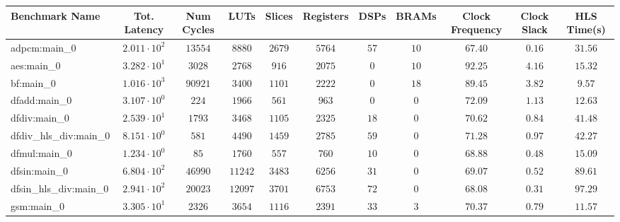 \begin{tabular}{|l|c|c|c|c|c|c|c|c|c|c|}
\hline
Benchmark Name          & Tot. Latency           & Num Cycles & LUTs      & Slices    & Registers & DSPs    & BRAMs   & Clock Frequency & Clock Slack & HLS Time(s) \\
\hline
adpcm:main\_0           & $ 2.011 \cdot 10^{2} $ & $ 13554  $ & $ 8880  $ & $ 2679  $ & $ 5764  $ & $ 57  $ & $ 10  $ & $ 67.40       $ & $ 0.16    $ & $ 31.56   $ \\
aes:main\_0             & $ 3.282 \cdot 10^{1} $ & $ 3028   $ & $ 2768  $ & $ 916   $ & $ 2075  $ & $ 0   $ & $ 10  $ & $ 92.25       $ & $ 4.16    $ & $ 15.32   $ \\
bf:main\_0              & $ 1.016 \cdot 10^{3} $ & $ 90921  $ & $ 3400  $ & $ 1101  $ & $ 2222  $ & $ 0   $ & $ 18  $ & $ 89.45       $ & $ 3.82    $ & $ 9.57    $ \\
dfadd:main\_0           & $ 3.107 \cdot 10^{0} $ & $ 224    $ & $ 1966  $ & $ 561   $ & $ 963   $ & $ 0   $ & $ 0   $ & $ 72.09       $ & $ 1.13    $ & $ 12.63   $ \\
dfdiv:main\_0           & $ 2.539 \cdot 10^{1} $ & $ 1793   $ & $ 3468  $ & $ 1105  $ & $ 2325  $ & $ 18  $ & $ 0   $ & $ 70.62       $ & $ 0.84    $ & $ 41.48   $ \\
dfdiv\_hls\_div:main\_0 & $ 8.151 \cdot 10^{0} $ & $ 581    $ & $ 4490  $ & $ 1459  $ & $ 2785  $ & $ 59  $ & $ 0   $ & $ 71.28       $ & $ 0.97    $ & $ 42.27   $ \\
dfmul:main\_0           & $ 1.234 \cdot 10^{0} $ & $ 85     $ & $ 1760  $ & $ 557   $ & $ 760   $ & $ 10  $ & $ 0   $ & $ 68.88       $ & $ 0.48    $ & $ 15.09   $ \\
dfsin:main\_0           & $ 6.804 \cdot 10^{2} $ & $ 46990  $ & $ 11242 $ & $ 3483  $ & $ 6256  $ & $ 31  $ & $ 0   $ & $ 69.07       $ & $ 0.52    $ & $ 89.61   $ \\
dfsin\_hls\_div:main\_0 & $ 2.941 \cdot 10^{2} $ & $ 20023  $ & $ 12097 $ & $ 3701  $ & $ 6753  $ & $ 72  $ & $ 0   $ & $ 68.08       $ & $ 0.31    $ & $ 97.29   $ \\
gsm:main\_0             & $ 3.305 \cdot 10^{1} $ & $ 2326   $ & $ 3654  $ & $ 1116  $ & $ 2391  $ & $ 33  $ & $ 3   $ & $ 70.37       $ & $ 0.79    $ & $ 11.57   $ \\

\end{tabular}
